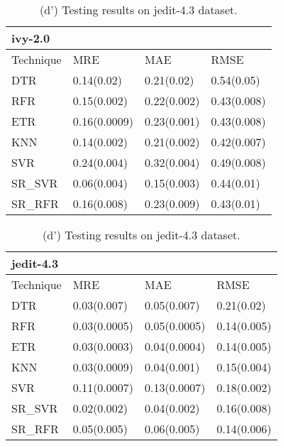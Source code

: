 \documentclass[]{article}
\begin{document}
	\begin{table}[h]
		\captionsetup[subtable]{labelformat=empty}
		\begin{adjustwidth}{-2.9cm}{}
			\begin{subtable}{9cm}
				\centering
				\caption{(c') Testing results on ivy-2.0 dataset.}
				\label{tab:ivy-wv}
				\begin{tabular}{llll}
					\hline
					ivy-2.0 &&&\\ \hline
					Technique & MRE & MAE & RMSE\\  \hline
					DTR & 0.14(0.02) & 0.21(0.02) & 0.54(0.05)\\ 
					RFR & 0.15(0.002) & 0.22(0.002) & 0.43(0.008)\\ 
					ETR & 0.16(0.0009) & 0.23(0.001) & 0.43(0.008)\\ 
					KNN & 0.14(0.002) & 0.21(0.002) & 0.42(0.007)\\ 
					SVR & 0.24(0.004) & 0.32(0.004) & 0.49(0.008)\\ 
					SR\_SVR & 0.06(0.004) & 0.15(0.003) & 0.44(0.01)\\
					SR\_RFR & 0.16(0.008) & 0.23(0.009) & 0.43(0.01)\\ \hline
				\end{tabular}
			\end{subtable}
			\begin{subtable}{9cm}
				\centering
				\caption{(d') Testing results on jedit-4.3 dataset.}
				\label{tab:jedit-wv}
				\begin{tabular}{llll}
					\hline
					jedit-4.3 &&&\\ \hline
					Technique & MRE & MAE & RMSE\\  \hline
					DTR & 0.03(0.007) & 0.05(0.007) & 0.21(0.02)\\ 
					RFR & 0.03(0.0005) & 0.05(0.0005) & 0.14(0.005)\\ 
					ETR & 0.03(0.0003) & 0.04(0.0004) & 0.14(0.005)\\ 
					KNN & 0.03(0.0009) & 0.04(0.001) & 0.15(0.004)\\ 
					SVR & 0.11(0.0007) & 0.13(0.0007) & 0.18(0.002)\\ 
					SR\_SVR & 0.02(0.002) & 0.04(0.002) & 0.16(0.008)\\
					SR\_RFR & 0.05(0.005) & 0.06(0.005) & 0.14(0.006)\\ \hline
				\end{tabular}
			\end{subtable} 
		\end{adjustwidth}
	\end{table}
\end{document}
